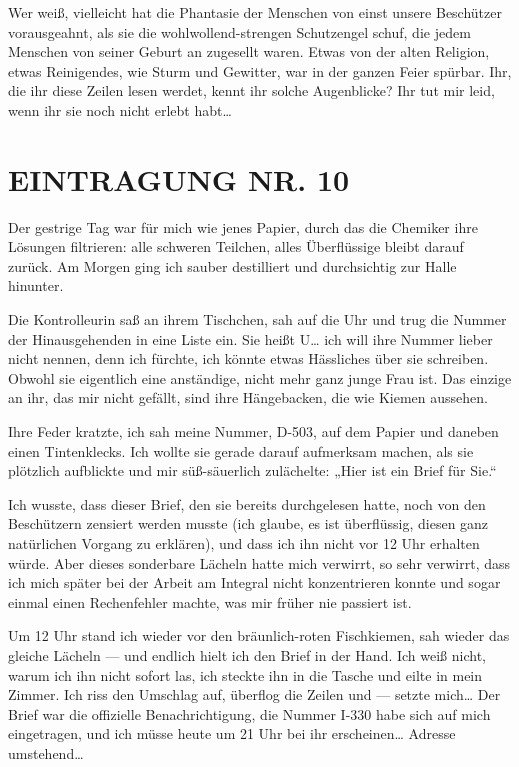 Wer weiß, vielleicht hat die Phantasie der Menschen von einst
unsere Beschützer vorausgeahnt, als sie die wohlwollend-strengen
Schutzengel schuf, die jedem Menschen von seiner Geburt an
zugesellt waren. Etwas von der alten Religion, etwas Reinigendes,
wie Sturm und Gewitter, war in der ganzen Feier spürbar. Ihr, die
ihr diese Zeilen lesen werdet, kennt ihr solche Augenblicke? Ihr
tut mir leid, wenn ihr sie noch nicht erlebt habt\ldots{}

\section{EINTRAGUNG NR. 10}

Der gestrige Tag war für mich wie jenes Papier, durch das die
Chemiker ihre Lösungen filtrieren: alle schweren Teilchen, alles
Überflüssige bleibt darauf zurück. Am Morgen ging ich sauber
destilliert und durchsichtig zur Halle hinunter.

Die Kontrolleurin saß an ihrem Tischchen, sah auf die Uhr und trug
die Nummer der Hinausgehenden in eine Liste ein. Sie heißt U\ldots{} ich
will ihre Nummer lieber nicht nennen, denn ich fürchte, ich könnte
etwas Hässliches über sie schreiben. Obwohl sie eigentlich eine
anständige, nicht mehr ganz junge Frau ist. Das einzige an ihr, das
mir nicht gefällt, sind ihre Hängebacken, die wie Kiemen aussehen.

Ihre Feder kratzte, ich sah meine Nummer, D-503, auf dem Papier und
daneben einen Tintenklecks. Ich wollte sie gerade darauf aufmerksam
machen, als sie plötzlich aufblickte und mir süß-säuerlich
zulächelte: „Hier ist ein Brief für Sie.“

Ich wusste, dass dieser Brief, den sie bereits durchgelesen hatte,
noch von den Beschützern zensiert werden musste (ich glaube, es ist
überflüssig, diesen ganz natürlichen Vorgang zu erklären), und dass
ich ihn nicht vor 12 Uhr erhalten würde. Aber dieses sonderbare
Lächeln hatte mich verwirrt, so sehr verwirrt, dass ich mich später
bei der Arbeit am Integral nicht konzentrieren konnte und sogar
einmal einen Rechenfehler machte, was mir früher nie passiert ist.

Um 12 Uhr stand ich wieder vor den bräunlich-roten Fischkiemen, sah
wieder das gleiche Lächeln — und endlich hielt ich den Brief in der
Hand. Ich weiß nicht, warum ich ihn nicht sofort las, ich steckte
ihn in die Tasche und eilte in mein Zimmer. Ich riss den Umschlag
auf, überflog die Zeilen und — setzte mich\ldots{} Der Brief war die
offizielle Benachrichtigung, die Nummer I-330 habe sich auf mich
eingetragen, und ich müsse heute um 21 Uhr bei ihr erscheinen\ldots{}
Adresse umstehend\ldots{}

